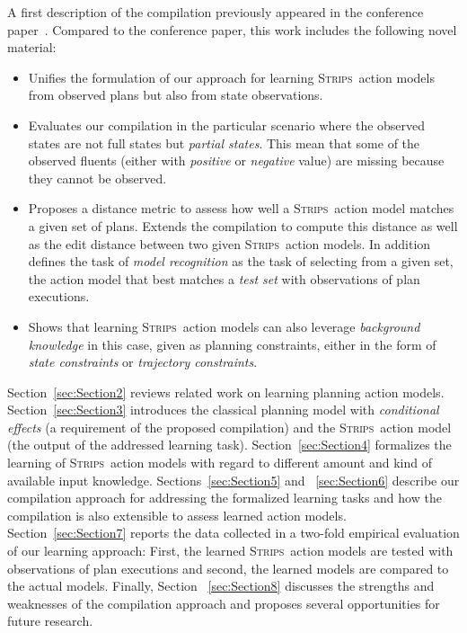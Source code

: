 \documentclass[3p,times]{elsarticle}
\newcommand{\strips}{\textsc{Strips}}     %
\begin{document}
A first description of the compilation previously appeared in the conference paper~\cite{aineto2018learning}. Compared to the conference paper, this work includes the following novel material:
\begin{itemize}
\item Unifies the formulation of our approach for learning \strips\ action models from observed plans but also from state observations.
\item Evaluates our compilation in the particular scenario where the observed states are not full states but {\em partial states}. This mean that some of the observed fluents (either with {\em positive} or {\em negative} value) are missing because they cannot be observed.
\item Proposes a distance metric to assess how well a \strips\ action model matches a given set of plans. Extends the compilation to compute this distance as well as the edit distance between two given \strips\ action models. In addition defines the task of {\em model recognition} as the task of selecting from a given set, the action model that best matches a {\em test set} with observations of plan executions.
\item Shows that learning \strips\ action models can also leverage {\em background knowledge} in this case, given as planning constraints, either in the form of {\em state constraints} or {\em trajectory constraints}.
\end{itemize}  

Section~\ref{sec:Section2} reviews related work on learning planning action models. Section~\ref{sec:Section3} introduces the classical planning model with {\em conditional effects} (a requirement of the proposed compilation) and the \strips\ action model (the output of the addressed learning task). Section~\ref{sec:Section4} formalizes the learning of \strips\ action models with regard to different amount and kind of available input knowledge. Sections~\ref{sec:Section5} and ~\ref{sec:Section6} describe our compilation approach for addressing the formalized learning tasks and how the compilation is also extensible to assess learned action models. Section~\ref{sec:Section7} reports the data collected in a two-fold empirical evaluation of our learning approach: First, the learned \strips\ action models are tested with observations of plan executions and second, the learned models are compared to the actual models. Finally, Section ~\ref{sec:Section8} discusses the strengths and weaknesses of the compilation approach and proposes several opportunities for future research.
\end{document}
